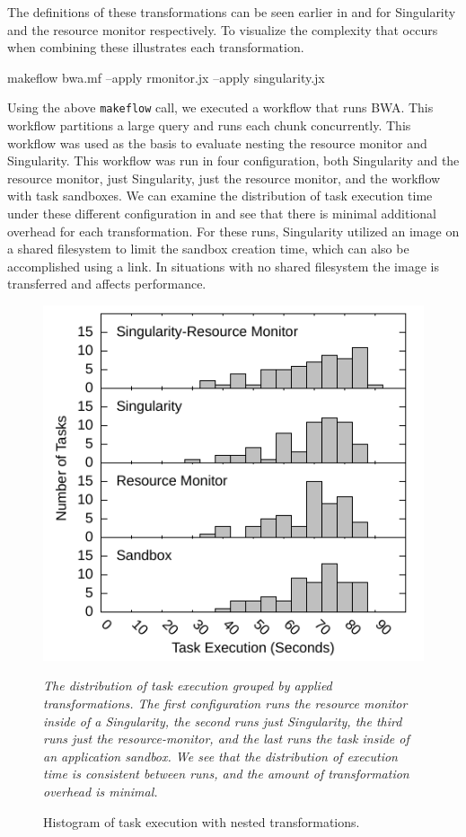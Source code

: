 \documentclass[conference]{IEEEtran}
\begin{document}
The definitions of these transformations can
be seen earlier in  and 
for Singularity and the resource monitor respectively.
To visualize the complexity that occurs when combining these
 illustrates each transformation.


\begin{framed}
\noindent
{\small makeflow bwa.mf --apply rmonitor.jx --apply singularity.jx}
\end{framed}

Using the above {\tt makeflow} call, we executed a workflow 
that runs BWA\cite{pmid20080505}.
This workflow partitions a large query and runs 
each chunk concurrently. 
This workflow was used as the basis to evaluate 
nesting the resource monitor and Singularity.
This workflow was run in four configuration,
both Singularity and the resource monitor,
just Singularity,
just the resource monitor,
and the workflow with task sandboxes.
We can examine the distribution of task
execution time under these different 
configuration in 
and see that there is minimal additional
overhead for each transformation.
For these runs, Singularity utilized
an image on a shared filesystem to
limit the sandbox creation time,
which can also be accomplished using
a link. In situations with no shared
filesystem the image is transferred
and affects performance.


\begin{figure}[h]
\includegraphics[width=\columnwidth]{graphics/divide_hist.pdf}
\caption{Histogram of task execution with nested transformations.}
\small
\emph{The distribution of task execution grouped by applied
transformations. 
The first configuration runs the resource monitor inside of
a Singularity, the second runs just Singularity,
the third runs just the resource-monitor, and the last
runs the task inside of an application sandbox.
We see that the distribution of execution
time is consistent between runs, and the amount of 
transformation overhead is minimal.
}
\label{figure:nest-task}
\end{figure}
\end{document}
